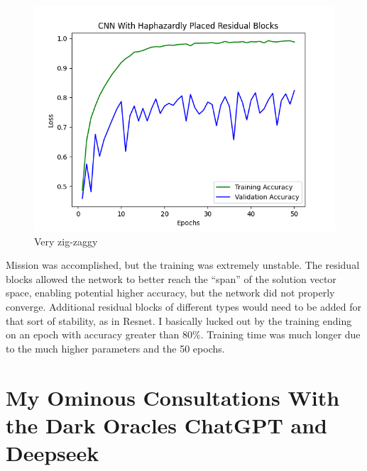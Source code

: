 \documentclass{article}
\begin{document}
    \begin{figure}[!htbp]
        \centerline{\includegraphics[width=0.55\columnwidth]{CNN With Haphazardly Placed Residual Blocks_1}}
        \caption{Very zig-zaggy}
        \label{fig:res}
    \end{figure}

    Mission was accomplished, but the training was extremely unstable.
    The residual blocks allowed the network to better reach the ``span'' of the solution vector space, enabling potential higher accuracy, but the network did not properly converge.
    Additional residual blocks of different types would need to be added for that sort of stability, as in Resnet.
    I basically lucked out by the training ending on an epoch with accuracy greater than 80\%.
    Training time was much longer due to the much higher parameters and the 50 epochs.

    \section{My Ominous Consultations With the Dark Oracles ChatGPT and Deepseek}\label{sec:gen-ai-blah}
\end{document}
